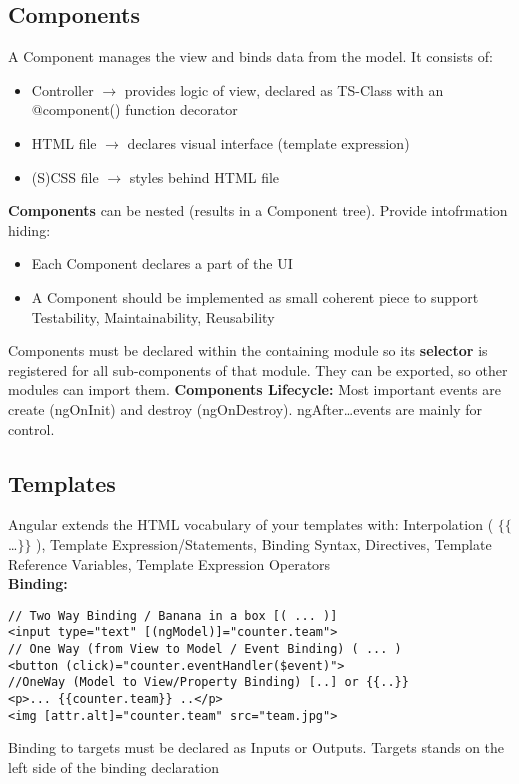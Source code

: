 \subsection{Components}
A Component manages the view and binds data from the model. It consists of:
\begin{itemize}[topsep=0pt, leftmargin=3mm]
    \setlength\itemsep{-0.3em}
    \item Controller $\rightarrow$ provides logic of view, declared as TS-Class with an @component() function decorator
    \item HTML file $\rightarrow$ declares visual interface (template expression)
    \item (S)CSS file $\rightarrow$ styles behind HTML file
\end{itemize}
\textbf{Components} can be nested (results in a Component tree). Provide intofrmation hiding:
\begin{itemize}[topsep=0pt, leftmargin=3mm]
    \setlength\itemsep{-0.3em}
    \item Each Component declares a part of the UI
    \item A Component should be implemented as small coherent piece to support \textcolor{b}{Testability}, \textcolor{b}{Maintainability}, \textcolor{b}{Reusability}
\end{itemize}
Components must be declared within the containing module so its \textbf{selector} is registered for all sub-components of that module. They can be exported, so other modules can import them.
\textcolor{b}{\textbf{Components Lifecycle:}} Most important events are create (ngOnInit) and destroy (ngOnDestroy). ngAfter\ldots events are mainly for control.
\subsection{Templates}
Angular extends the HTML vocabulary of your templates with: Interpolation ( $\{\{$\ldots$\}\}$ ), Template Expression/Statements, Binding Syntax, Directives, Template Reference Variables, Template Expression Operators\\
\textcolor{b}{\textbf{Binding:}}
\begin{lstlisting}[style=htmlcssjs]
// Two Way Binding / Banana in a box [( ... )]
<input type="text" [(ngModel)]="counter.team">
// One Way (from View to Model / Event Binding) ( ... )
<button (click)="counter.eventHandler($event)">
//OneWay (Model to View/Property Binding) [..] or {{..}}
<p>... {{counter.team}} ..</p>
<img [attr.alt]="counter.team" src="team.jpg">
\end{lstlisting}
Binding to targets must be declared as Inputs or Outputs. Targets stands on the left side of the binding declaration
